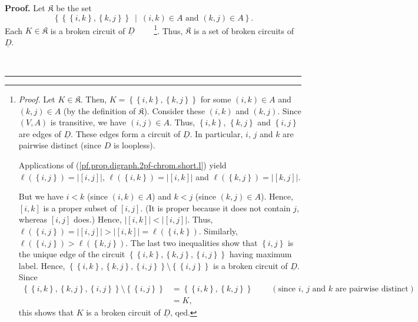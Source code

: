 \documentclass[numbers=enddot,12pt,final,onecolumn,notitlepage]{scrartcl}%
\theoremstyle{definition}
\newenvironment{proof}[1][Proof]{\noindent\textbf{#1.} }{\ \rule{0.5em}{0.5em}}
\newenvironment{vershort}{}{}
\begin{document}
\begin{vershort}
\begin{proof}
Let $\mathfrak{K}$ be the set
\[
\left\{  \left\{  \left\{  i,k\right\}  ,\left\{  k,j\right\}  \right\}
\ \mid\ \left(  i,k\right)  \in A\text{ and }\left(  k,j\right)  \in
A\right\}  .
\]
Each $K\in\mathfrak{K}$ is a broken circuit of $\underline{D}$%
\ \ \ \ \footnote{\textit{Proof.} Let $K\in\mathfrak{K}$. Then, $K=\left\{
\left\{  i,k\right\}  ,\left\{  k,j\right\}  \right\}  $ for some $\left(
i,k\right)  \in A$ and $\left(  k,j\right)  \in A$ (by the definition of
$\mathfrak{K}$). Consider these $\left(  i,k\right)  $ and $\left(
k,j\right)  $. Since $\left(  V,A\right)  $ is transitive, we have $\left(
i,j\right)  \in A$. Thus, $\left\{  i,k\right\}  $, $\left\{  k,j\right\}  $
and $\left\{  i,j\right\}  $ are edges of $\underline{D}$. These edges form a
circuit of $\underline{D}$. In particular, $i$, $j$ and $k$ are pairwise
distinct (since $D$ is loopless).
\par
Applications of (\ref{pf.prop.digraph.2pf-chrom.short.l}) yield $\ell\left(
\left\{  i,j\right\}  \right)  =\left\vert \left[  i,j\right]  \right\vert $,
$\ell\left(  \left\{  i,k\right\}  \right)  =\left\vert \left[  i,k\right]
\right\vert $ and $\ell\left(  \left\{  k,j\right\}  \right)  =\left\vert
\left[  k,j\right]  \right\vert $.
\par
But we have $i<k$ (since $\left(  i,k\right)  \in A$) and $k<j$ (since
$\left(  k,j\right)  \in A$). Hence, $\left[  i,k\right]  $ is a proper subset
of $\left[  i,j\right]  $. (It is proper because it does not contain $j$,
whereas $\left[  i,j\right]  $ does.) Hence, $\left\vert \left[  i,k\right]
\right\vert <\left\vert \left[  i,j\right]  \right\vert $. Thus, $\ell\left(
\left\{  i,j\right\}  \right)  =\left\vert \left[  i,j\right]  \right\vert
>\left\vert \left[  i,k\right]  \right\vert =\ell\left(  \left\{  i,k\right\}
\right)  $. Similarly, $\ell\left(  \left\{  i,j\right\}  \right)
>\ell\left(  \left\{  k,j\right\}  \right)  $. The last two inequalities show
that $\left\{  i,j\right\}  $ is the unique edge of the circuit $\left\{
\left\{  i,k\right\}  ,\left\{  k,j\right\}  ,\left\{  i,j\right\}  \right\}
$ having maximum label. Hence, $\left\{  \left\{  i,k\right\}  ,\left\{
k,j\right\}  ,\left\{  i,j\right\}  \right\}  \setminus\left\{  \left\{
i,j\right\}  \right\}  $ is a broken circuit of $\underline{D}$. Since%
\begin{align*}
\left\{  \left\{  i,k\right\}  ,\left\{  k,j\right\}  ,\left\{  i,j\right\}
\right\}  \setminus\left\{  \left\{  i,j\right\}  \right\}   &  =\left\{
\left\{  i,k\right\}  ,\left\{  k,j\right\}  \right\}
\ \ \ \ \ \ \ \ \ \ \left(  \text{since }i\text{, }j\text{ and }k\text{ are
pairwise distinct}\right) \\
&  =K,
\end{align*}
this shows that $K$ is a broken circuit of $\underline{D}$, qed.}. Thus,
$\mathfrak{K}$ is a set of broken circuits of $\underline{D}$.


\end{proof}
\end{vershort}
\end{document}
